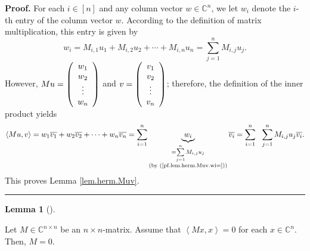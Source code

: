 \documentclass[numbers=enddot,12pt,final,onecolumn,notitlepage]{scrartcl}%
\numberwithin{exer}{subsection}
\theoremstyle{definition}
\newtheorem{lem}[theo]{Lemma}
\newenvironment{lemma}[1][]
{\begin{lem}[#1]\begin{leftbar}}
{\end{leftbar}\end{lem}}
\newenvironment{proof}[1][Proof]{\noindent\textbf{#1.} }{\ \rule{0.5em}{0.5em}}
\let\sumnonlimits\sum
\renewcommand{\sum}{\sumnonlimits\limits}
\begin{document}
\begin{proof}
For each $i\in\left[  n\right]  $ and any column vector $w\in\mathbb{C}^{n}$,
we let $w_{i}$ denote the $i$-th entry of the column vector $w$. According to
the definition of matrix multiplication, this entry is given by%
\begin{equation}
w_{i}=M_{i,1}u_{1}+M_{i,2}u_{2}+\cdots+M_{i,n}u_{n}=\sum_{j=1}^{n}M_{i,j}%
u_{j}.\label{pf.lem.herm.Muv.wi=}%
\end{equation}
However, $Mu=\left(
\begin{array}
[c]{c}%
w_{1}\\
w_{2}\\
\vdots\\
w_{n}%
\end{array}
\right)  $ and $v=\left(
\begin{array}
[c]{c}%
v_{1}\\
v_{2}\\
\vdots\\
v_{n}%
\end{array}
\right)  $; therefore, the definition of the inner product yields%
\[
\left\langle Mu,v\right\rangle =w_{1}\overline{v_{1}}+w_{2}\overline{v_{2}%
}+\cdots+w_{n}\overline{v_{n}}=\sum_{i=1}^{n}\underbrace{w_{i}}%
_{\substack{=\sum_{j=1}^{n}M_{i,j}u_{j}\\\text{(by (\ref{pf.lem.herm.Muv.wi=}%
))}}}\overline{v_{i}}=\sum_{i=1}^{n}\ \ \sum_{j=1}^{n}M_{i,j}u_{j}%
\overline{v_{i}}.
\]
This proves Lemma \ref{lem.herm.Muv}.
\end{proof}

\begin{lemma}
\label{lem.herm.M=0}Let $M\in\mathbb{C}^{n\times n}$ be an $n\times n$-matrix.
Assume that $\left\langle Mx,x\right\rangle =0$ for each $x\in\mathbb{C}^{n}$.
Then, $M=0$.
\end{lemma}
\end{document}
